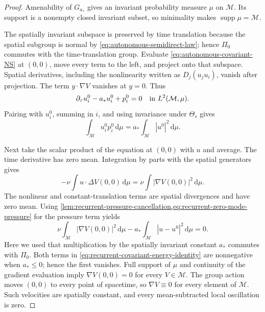 \documentclass[11pt]{amsart}
\numberwithin{equation}{section}
\theoremstyle{plain}
\theoremstyle{definition}
\theoremstyle{remark}
\newcommand{\dd}{\,\mathrm d}
\newcommand{\supp}{\operatorname{supp}}
\begin{document}
\begin{proof}
Amenability of \(G_{a_*}\) gives an invariant probability measure \(\mu\)
on \(\mathcal M\).  Its support is a nonempty closed invariant subset, so
minimality makes \(\supp\mu=\mathcal M\).

The spatially invariant subspace is preserved by time translation because
the spatial subgroup is normal by \eqref{eq:autonomous-semidirect-law}; hence
\(\Pi_0\) commutes with the time-translation group.  Evaluate
\eqref{eq:autonomous-covariant-NS} at \((0,0)\), move every term to the
left, and project onto that subspace.  Spatial derivatives, including the
nonlinearity written as \(D_j(u_ju_i)\), vanish after projection.  The term
\(y\cdot\nabla V\) vanishes at \(y=0\).  Thus
\begin{equation}\label{eq:recurrent-zero-mode-equation}
 \partial_\tau u_i^0-a_*u_i^0+p_i^0=0
 \quad\hbox{in }L^2(\mathcal M,\mu).
\end{equation}
Pairing with \(u_i^0\), summing in \(i\), and using invariance under
\(\Theta_s\) gives
\begin{equation}\label{eq:recurrent-zero-mode-pressure}
 \int_{\mathcal M}u_i^0p_i^0\dd\mu
 =a_*\int_{\mathcal M}|u^0|^2\dd\mu.
\end{equation}

Next take the scalar product of the equation at \((0,0)\) with \(u\) and
average.  The time derivative has zero mean.  Integration by parts with the
spatial generators gives
\[
 -\nu\int u\cdot\Delta V(0,0)\dd\mu
 =\nu\int|\nabla V(0,0)|^2\dd\mu.
\]
The nonlinear and constant-translation terms are spatial divergences and
have zero mean.  Using
\cref{lem:recurrent-pressure-cancellation,eq:recurrent-zero-mode-pressure}
for the pressure term yields
\begin{equation}\label{eq:recurrent-covariant-energy-identity}
 \nu\int_{\mathcal M}|\nabla V(0,0)|^2\dd\mu
 -a_*\int_{\mathcal M}|u-u^0|^2\dd\mu=0.
\end{equation}
Here we used that multiplication by the spatially invariant constant
\(a_*\) commutes with \(\Pi_0\).  Both terms in
\eqref{eq:recurrent-covariant-energy-identity} are nonnegative when
\(a_*\le0\); hence the first vanishes.  Full support of \(\mu\) and
continuity of the gradient evaluation imply
\(\nabla V(0,0)=0\) for every \(V\in\mathcal M\).  The group action moves
\((0,0)\) to every point of spacetime, so \(\nabla V\equiv0\) for every
element of \(\mathcal M\).  Such velocities are spatially constant, and
every mean-subtracted local oscillation is zero.
\end{proof}
\end{document}
